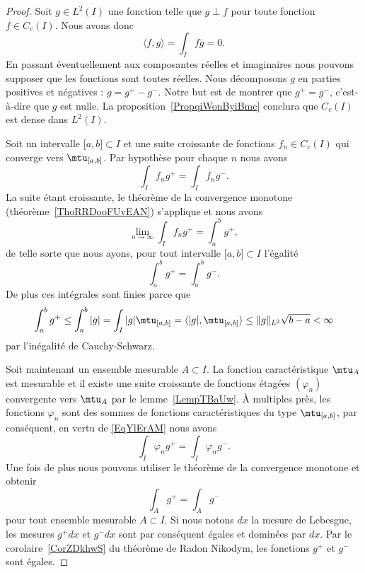 \begin{proof}
	Soit \( g\in L^2(I)\) une fonction telle que \( g\perp f\) pour toute fonction \( f\in C_c(I)\). Nous avons donc
	\begin{equation}
		\langle f, g\rangle =\int_If\bar g=0.
	\end{equation}
	En passant éventuellement aux composantes réelles et imaginaires nous pouvons supposer que les fonctions sont toutes réelles. Nous décomposons \( g\) en parties positives et négatives : \( g=g^+-g^-\). Notre but est de montrer que \( g^+=g^-\), c'est-à-dire que \( g\) est nulle. La proposition~\ref{PropqiWonByiBmc} conclura que \( C_c(I)\) est dense dans \( L^2(I)\).

	Soit un intervalle \( \mathopen[ a , b \mathclose]\subset I\) et une suite croissante de fonctions \( f_n\in C_c(I)\) qui converge vers \( \mtu_{\mathopen[ a , b \mathclose]}\). Par hypothèse pour chaque \( n\) nous avons
	\begin{equation}
		\int_If_ng^+=\int_I f_ng^-.
	\end{equation}
	La suite étant croissante, le théorème de la convergence monotone (théorème~\ref{ThoRRDooFUvEAN}) s'applique et nous avons
	\begin{equation}
		\lim_{n\to \infty} \int_I f_ng^+=\int_a^bg^+,
	\end{equation}
	de telle sorte que nous ayons, pour tout intervalle \( \mathopen[ a , b \mathclose]\subset I\) l'égalité
	\begin{equation}        \label{EqYlErAM}
		\int_a^bg^+=\int_a^bg^-.
	\end{equation}
	De plus ces intégrales sont finies parce que
	\begin{equation}
		\int_a^b g^+\leq\int_a^b| g |=\int_I| g |\mtu_{\mathopen[ a , b \mathclose]}=\langle | g |, \mtu_{\mathopen[ a , b \mathclose]}\rangle \leq \| g \|_{L^2}\sqrt{b-a}<\infty
	\end{equation}
	par l'inégalité de Cauchy-Schwarz.

	Soit maintenant un ensemble mesurable \( A\subset I\). La fonction caractéristique \( \mtu_A\) est mesurable et il existe une suite croissante de fonctions étagées \( (\varphi_n)\) convergente vers \( \mtu_A\) par le lemme~\ref{LempTBaUw}. À multiples près, les fonctions \( \varphi_n\) sont des sommes de fonctions caractéristiques du type \( \mtu_{\mathopen[ a , b \mathclose]}\), par conséquent, en vertu de \eqref{EqYlErAM} nous avons
	\begin{equation}
		\int_I\varphi_ng^+=\int_I\varphi_ng^-.
	\end{equation}
	Une fois de plus nous pouvons utiliser le théorème de la convergence monotone et obtenir
	\begin{equation}
		\int_Ag^+=\int_A g^-
	\end{equation}
	pour tout ensemble mesurable \( A\subset I\). Si nous notons \( dx\) la mesure de Lebesgue, les mesures \( g^+dx\) et \( g^-dx\) sont par conséquent égales et dominées par \( dx\). Par le corolaire~\ref{CorZDkhwS} du théorème de Radon Nikodym, les fonctions \( g^+\) et \( g^-\) sont égales.
\end{proof}

